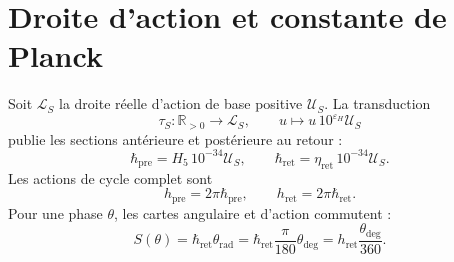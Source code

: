 \section{Droite d'action et constante de Planck}
\label{sec:l9s102:recta-planck}

Soit \(\mathcal L_S\) la droite réelle d'action de base positive
\(\mathcal U_S\). La transduction
\begin{equation}
 \tau_S:\mathbb R_{>0}\longrightarrow\mathcal L_S,
 \qquad u\longmapsto u\,10^{\varepsilon_H}\mathcal U_S
 \label{eq:l9s102:transductor-accion}
\end{equation}
publie les sections antérieure et postérieure au retour :
\begin{equation}
 \hbar_{\mathrm{pre}}=H_5\,10^{-34}\mathcal U_S,
 \qquad
 \boxed{
 \hbar_{\mathrm{ret}}=\eta_{\mathrm{ret}}\,10^{-34}\mathcal U_S.}
 \label{eq:l9s102:hbar-pre-ret}
\end{equation}
Les actions de cycle complet sont
\begin{equation}
 h_{\mathrm{pre}}=2\pi\hbar_{\mathrm{pre}},
 \qquad
 h_{\mathrm{ret}}=2\pi\hbar_{\mathrm{ret}}.
 \label{eq:l9s102:h-pre-ret}
\end{equation}
Pour une phase \(\theta\), les cartes angulaire et d'action commutent :
\begin{equation}
 S(\theta)
 =\hbar_{\mathrm{ret}}\theta_{\mathrm{rad}}
 =\hbar_{\mathrm{ret}}\frac{\pi}{180}\theta_{\deg}
 =h_{\mathrm{ret}}\frac{\theta_{\deg}}{360}.
 \label{eq:l9s102:accion-fase}
\end{equation}

